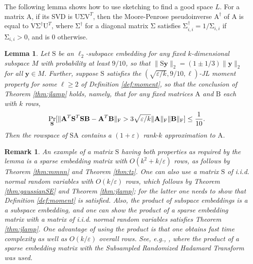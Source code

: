 \documentclass[11pt]{article}
\newcommand{\FNorm }[1]{\mbox{}\|#1\|_\mathrm{F}  }
\newtheorem{lemma}[theorem]{Lemma}
\newtheorem{remark}[theorem]{Remark}
\newcommand{\mat}[1]{{\ensuremath{\bm{\mathrm{#1}}}}}
\def\matA{\mat{A}}
\def\matB{\mat{B}}
\def\matS{\mat{S}}
\def\matU{\mat{U}}
\def\matV{\mat{V}}
\def\frac#1#2{{#1\over #2}}
\def\y{{\mathbf y}}
\newcommand{\eps}{\varepsilon}
\begin{document}
The following lemma shows how to use sketching to find a good space $L$. For a matrix
$\matA$, if its SVD is $\matU \mat\Sigma \matV^T$, then the Moore-Penrose pseudoinverse $\matA^{\dagger}$ of $\matA$
is equal to $\matV \mat\Sigma^{\dagger} \matU^T$, where $\mat\Sigma^{\dagger}$ for a diagonal matrix $\mat\Sigma$
satisfies $\mat\Sigma^{\dagger}_{i,i} = 1/\mat\Sigma_{i,i}$ if $\mat\Sigma_{i,i} > 0$, and is $0$ otherwise. 
\begin{lemma}\label{lem:sketching}
Let $\matS$ be an $\ell_2$-subspace embedding for any fixed $k$-dimensional subspace $M$ 
with probability at least $9/10$, so that
$\|\matS\y\|_2 = (1 \pm 1/3) \|\y\|_2$ for all $\y \in M$. Further, suppose $\matS$ satisfies
the $(\sqrt{\eps/k}, 9/10, \ell)$-JL moment property for some $\ell \geq 2$ of Definition \ref{def:moment}, so
that the conclusion of Theorem \ref{thm:jlamp} holds, namely, that for any fixed matrices $\matA$ and $\matB$ each with 
$k$ rows, 
$$\Pr_{\matS}[\FNorm{\matA^T\matS^T\matS\matB -\matA^T\matB} > 3\sqrt{\eps/k} \FNorm{\matA} \FNorm{\matB}] \leq \frac{1}{10}.$$
Then the rowspace of $\matS\matA$ contains a $(1+\eps)$ rank-$k$ approximation to $\matA$. 
\end{lemma}
\begin{remark}
An example of a matrix $\matS$ having both properties as required by the lemma 
is a sparse embedding matrix with
$O(k^2 + k/\eps)$ rows, as follows by Theorem \ref{thm:mmnn} and Theorem \ref{thm:tz}. One
can also use a matrix $\matS$ of i.i.d. normal random variables with $O(k/\eps)$ rows, 
which follows by Theorem
\ref{thm:gaussianSE} and Theorem \ref{thm:jlamp}; for the latter one needs to show that Definition
\ref{def:moment} is satisfied. Also, the product of subspace embeddings is a 
a subspace embedding, and one can show the product of a sparse embedding matrix with
a matrix of i.i.d. normal random variables satisfies Theorem \ref{thm:jlamp}. One advantage of
using the product is that one obtains fast time complexity as well as $O(k/\eps)$ overall rows.
See, e.g., \cite{CW13}, where the product of a sparse embedding matrix with the Subsampled
Randomized Hadamard Transform was used. 
\end{remark}
\end{document}
